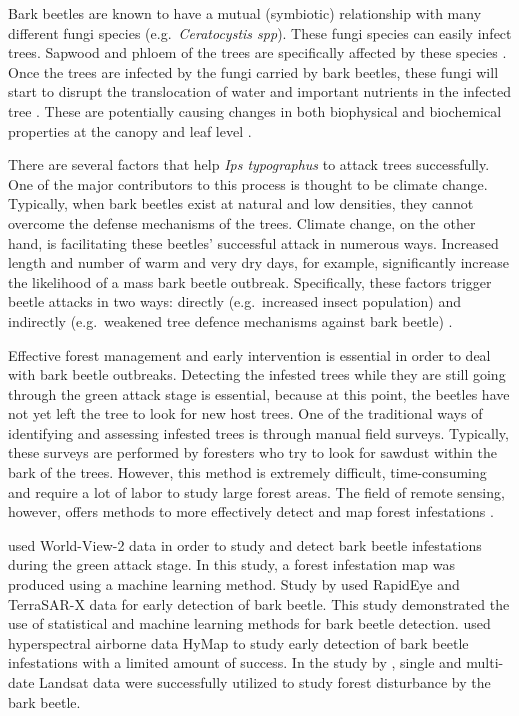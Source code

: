 \documentclass[a4paper, twoside]{templates/ociamthesis}
\begin{document}
Bark beetles are known to have a mutual (symbiotic) relationship with many different fungi species (e.g.~\emph{Ceratocystis spp}). These fungi species can easily infect trees. Sapwood and phloem of the trees are specifically affected by these species \citep{niemann2005assessment, six2003genetic}. Once the trees are infected by the fungi carried by bark beetles, these fungi will start to disrupt the translocation of water and important nutrients in the infected tree \citep{paine1997interactions, wermelinger2004ecology}. These are potentially causing changes in both biophysical and biochemical properties at the canopy and leaf level \citep{abdullah2018european}.

There are several factors that help \emph{Ips typographus} to attack trees successfully. One of the major contributors to this process is thought to be climate change. Typically, when bark beetles exist at natural and low densities, they cannot overcome the defense mechanisms of the trees. Climate change, on the other hand, is facilitating these beetles' successful attack in numerous ways. Increased length and number of warm and very dry days, for example, significantly increase the likelihood of a mass bark beetle outbreak. Specifically, these factors trigger beetle attacks in two ways: directly (e.g.~increased insect population) and indirectly (e.g.~weakened tree defence mechanisms against bark beetle) \citep{bale2002herbivory, bentz2015modeling, marini2017climate}.

Effective forest management and early intervention is essential in order to deal with bark beetle outbreaks. Detecting the infested trees while they are still going through the green attack stage is essential, because at this point, the beetles have not yet left the tree to look for new host trees. One of the traditional ways of identifying and assessing infested trees is through manual field surveys. Typically, these surveys are performed by foresters who try to look for sawdust within the bark of the trees. However, this method is extremely difficult, time-consuming and require a lot of labor to study large forest areas. The field of remote sensing, however, offers methods to more effectively detect and map forest infestations \citep{abdullah2019sentinel, immitzer2014early}.

\citet{immitzer2014early} used World-View-2 data in order to study and detect bark beetle infestations during the green attack stage. In this study, a forest infestation map was produced using a machine learning method. Study by \citet{ortiz2013early} used RapidEye and TerraSAR-X data for early detection of bark beetle. This study demonstrated the use of statistical and machine learning methods for bark beetle detection. \citet{lausch2013forecasting} used hyperspectral airborne data HyMap to study early detection of bark beetle infestations with a limited amount of success. In the study by \citet{lausch2013forecasting}, single and multi-date Landsat data were successfully utilized to study forest disturbance by the bark beetle.
\end{document}

